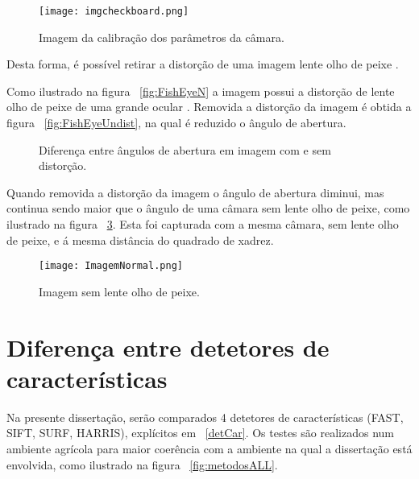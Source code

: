 \begin{figure}[h!]  %
	\centering
	\texttt{[image: imgcheckboard.png]} 
	\caption{Imagem da calibração dos parâmetros da câmara.}
	\label{fig:imgcheckboard}  %
\end{figure}


Desta forma, é possível retirar a distorção de uma imagem lente olho de peixe . 



Como ilustrado na figura ~\ref{fig:FishEyeN} a imagem possui a distorção de lente olho de peixe  de uma grande ocular .  Removida a distorção da imagem é obtida a figura ~\ref{fig:FishEyeUndist}, na qual é reduzido o ângulo de abertura.

\begin{figure}[h!]
	\centering
	\qquad
	\caption{Diferença entre ângulos de abertura em imagem com e sem distorção.}\label{fig:FisheEye}
\end{figure}


Quando removida a distorção da imagem o ângulo de abertura diminui, mas continua sendo maior que o ângulo de uma câmara sem lente olho de peixe, como ilustrado na figura ~\ref{fig:ImageNorm}. Esta foi capturada com a mesma câmara, sem lente olho de peixe, e á mesma distância do quadrado de xadrez.

\begin{figure}[h!]
	\centering
	\texttt{[image: ImagemNormal.png]}
	\caption{Imagem sem lente olho de peixe.}
	\label{fig:ImageNorm}
\end{figure}







\section{Diferença entre detetores de características}

Na presente dissertação, serão comparados 4 detetores de características (FAST, SIFT, SURF, HARRIS), explícitos em  ~\ref{detCar}. Os testes são realizados num ambiente agrícola para maior coerência com a ambiente na qual a dissertação está envolvida, como ilustrado na figura ~\ref{fig:metodosALL}.


